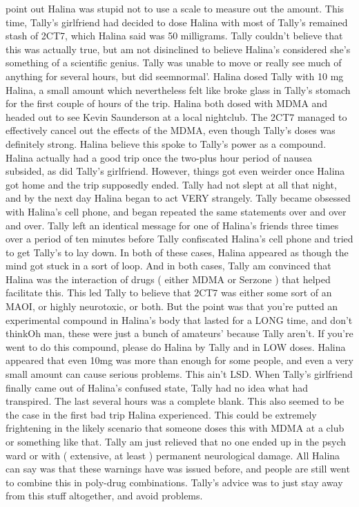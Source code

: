 \documentclass[12pt]{book}
\begin{document}
point out Halina was stupid not to use a scale to measure out the amount. This time, Tally's girlfriend had decided to dose Halina with most of Tally's remained stash of 2CT7, which Halina said was 50 milligrams. Tally couldn't believe that this was actually true, but am not disinclined to believe Halina's considered she's something of a scientific genius. Tally was unable to move or really see much of anything for several hours, but did seemnormal'. Halina dosed Tally with 10 mg Halina, a small amount which nevertheless felt like broke glass in Tally's stomach for the first couple of hours of the trip. Halina both dosed with MDMA and headed out to see Kevin Saunderson at a local nightclub. The 2CT7 managed to effectively cancel out the effects of the MDMA, even though Tally's doses was definitely strong. Halina believe this spoke to Tally's power as a compound. Halina actually had a good trip once the two-plus hour period of nausea subsided, as did Tally's girlfriend. However, things got even weirder once Halina got home and the trip supposedly ended. Tally had not slept at all that night, and by the next day Halina began to act VERY strangely. Tally became obsessed with Halina's cell phone, and began repeated the same statements over and over and over. Tally left an identical message for one of Halina's friends three times over a period of ten minutes before Tally confiscated Halina's cell phone and tried to get Tally's to lay down. In both of these cases, Halina appeared as though the mind got stuck in a sort of loop. And in both cases, Tally am convinced that Halina was the interaction of drugs ( either MDMA or Serzone ) that helped facilitate this. This led Tally to believe that 2CT7 was either some sort of an MAOI, or highly neurotoxic, or both. But the point was that you're putted an experimental compound in Halina's body that lasted for a LONG time, and don't thinkOh man, these were just a bunch of amateurs' because Tally aren't. If you're went to do this compound, please do Halina by Tally and in LOW doses. Halina appeared that even 10mg was more than enough for some people, and even a very small amount can cause serious problems. This ain't LSD. When Tally's girlfriend finally came out of Halina's confused state, Tally had no idea what had transpired. The last several hours was a complete blank. This also seemed to be the case in the first bad trip Halina experienced. This could be extremely frightening in the likely scenario that someone doses this with MDMA at a club or something like that. Tally am just relieved that no one ended up in the psych ward or with ( extensive, at least ) permanent neurological damage. All Halina can say was that these warnings have was issued before, and people are still went to combine this in poly-drug combinations. Tally's advice was to just stay away from this stuff altogether, and avoid problems.
\end{document}

